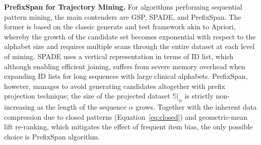 \textbf{PrefixSpan for Trajectory Mining.} For algorithms performing sequential pattern mining, the main contenders are GSP, SPADE, and PrefixSpan. The former is based on the classic generate and test framework akin to Apriori, whereby the growth of the candidate set becomes exponential with respect to the alphabet size and requires multiple scans through the entire dataset at each level of mining. SPADE uses a vertical representation in terms of ID list, which although enabling efficient joining, suffers from severe memory overhead when expanding ID lists for long sequences with large clinical alphabets. PrefixSpan, however, manages to avoid generating candidates altogether with prefix projection technique; the size of the projected dataset $\mathbb{S}|_\alpha$ is strictly non-increasing as the length of the sequence $\alpha$ grows. Together with the inherent data compression due to closed patterns (Equation~\eqref{eq:closed}) and geometric-mean lift re-ranking, which mitigates the effect of frequent item bias, the only possible choice is PrefixSpan algorithm.

